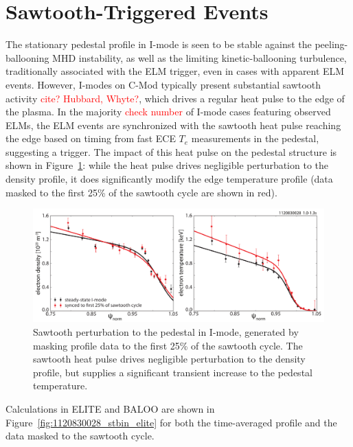 \documentclass[12pt,floatfix,showpacs]{revtex4-1}
\newcommand{\note}[1]{\textcolor{red}{#1}}
\begin{document}
\section{Sawtooth-Triggered Events}\label{sec:sawtooth}

The stationary pedestal profile in I-mode is seen to be stable against the peeling-ballooning MHD instability, as well as the limiting kinetic-ballooning turbulence, traditionally associated with the ELM trigger, even in cases with apparent ELM events.
However, I-modes on C-Mod typically present substantial sawtooth activity \note{cite? Hubbard, Whyte?}, which drives a regular heat pulse to the edge of the plasma.
In the majority \note{check number} of I-mode cases featuring observed ELMs, the ELM events are synchronized with the sawtooth heat pulse reaching the edge based on timing from fast ECE $T_e$ measurements in the pedestal, suggesting a trigger.
The impact of this heat pulse on the pedestal structure is shown in Figure~\ref{fig:prof_stbin}: while the heat pulse drives negligible perturbation to the density profile, it does significantly modify the edge temperature profile (data masked to the first 25\% of the sawtooth cycle are shown in red).

\begin{figure}[htp]
 \includegraphics[width=\textwidth]{pdfgraphics/1120830028_prof_stbin.pdf}
 \caption{Sawtooth perturbation to the pedestal in I-mode, generated by masking profile data to the first 25\% of the sawtooth cycle.  The sawtooth heat pulse drives negligible perturbation to the density profile, but supplies a significant transient increase to the pedestal temperature.}
 \label{fig:prof_stbin}
\end{figure}

Calculations in ELITE and BALOO are shown in Figure~\ref{fig:1120830028_stbin_elite} for both the time-averaged profile and the data masked to the sawtooth cycle.
\end{document}
